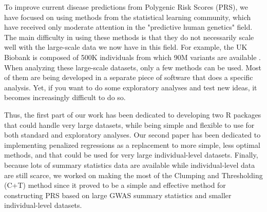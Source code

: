To improve current disease predictions from Polygenic Risk Scores (PRS), we have focused on using methods from the statistical learning community, which have received only moderate attention in the "predictive human genetics" field.
The main difficulty in using these methods is that they do not necessarily scale well with the large-scale data we now have in this field.
For example, the UK Biobank is composed of 500K individuals from which 90M variants are available \cite[]{bycroft2017genome}.
When analyzing these large-scale datasets, only a few methods can be used.
Most of them are being developed in a separate piece of software that does a specific analysis.
Yet, if you want to do some exploratory analyses and test new ideas, it becomes increasingly difficult to do so.

Thus, the first part of our work has been dedicated to developing two R packages that could handle very large datasets, while being simple and flexible to use for both standard and exploratory analyses. 
Our second paper has been dedicated to implementing penalized regressions as a replacement to more simple, less optimal methods, and that could be used for very large individual-level datasets.
Finally, because lots of summary statistics data are available while individual-level data are still scarce, we worked on making the most of the Clumping and Thresholding (C+T) method since it proved to be a simple and effective method for constructing PRS based on large GWAS summary statistics and smaller individual-level datasets.
